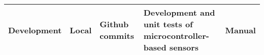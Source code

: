 \begin{longtable}[]{@{}lllll@{}}
\begin{minipage}[t]{0.11\columnwidth}\raggedright
Development\strut
\end{minipage} & \begin{minipage}[t]{0.21\columnwidth}\raggedright
Local\strut
\end{minipage} & \begin{minipage}[t]{0.22\columnwidth}\raggedright
Github commits\strut
\end{minipage} & \begin{minipage}[t]{0.23\columnwidth}\raggedright
Development and unit tests of microcontroller-based sensors\strut
\end{minipage} & \begin{minipage}[t]{0.10\columnwidth}\raggedright
Manual\strut
\end{minipage}\tabularnewline
\bottomrule
\end{longtable}
